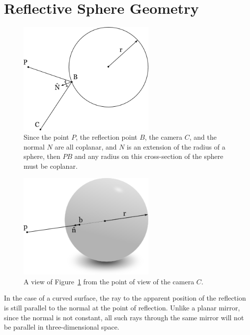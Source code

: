 \documentclass{thesis}
\begin{document}
\section{Reflective Sphere Geometry}
\begin{figure}
	\centering
    	\includegraphics[width=0.6\textwidth]{colinear-radius}
	\caption{Since the point $P$, the reflection point $B$, the camera $C$, and the normal $N$ are all coplanar, and $N$ is an extension of the radius of a sphere, then $PB$ and any radius on this cross-section of the sphere must be coplanar.}
	\label{colinear-radius}
\end{figure}

\begin{figure}
	\centering
    	\includegraphics[width=0.6\textwidth]{colinear-radius-camera-view}
	\caption{A view of Figure~\ref{colinear-radius} from the point of view of the camera $C$.}
	\label{colinear-radius-camera-view}
\end{figure}

In the case of a curved surface, the ray to the apparent position of the reflection is still parallel to the normal at the point of reflection. Unlike a planar mirror, since the normal is not constant, all such rays through the same mirror will not be parallel in three-dimensional space.
\end{document}
